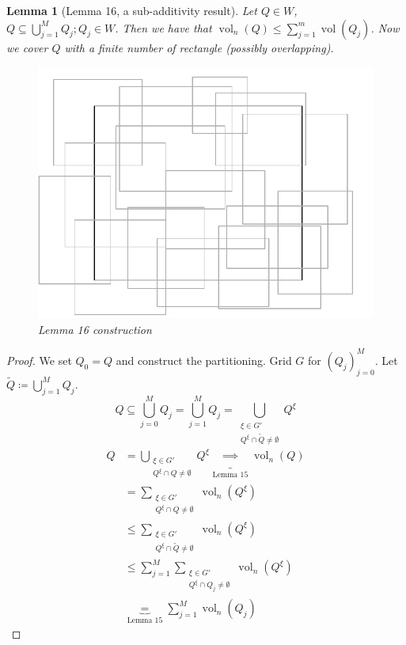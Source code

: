 \documentclass{article}
\newtheorem{lemma}{Lemma}  \numberwithin{lemma}{section}
\DeclareMathOperator{\vol}{vol}  %
\begin{document}
\begin{lemma}[Lemma 16, a sub-additivity result]
  Let $Q \in W$, $Q \subseteq \bigcup_{j=1}^M Q_j; Q_j \in W$.
  Then we have that $\vol_n(Q) \leq \sum_{j=1}^m \vol(Q_j)$.
  Now we cover $Q$ with a finite number of rectangle (possibly overlapping).
  \begin{figure}[!h]
    \begin{center}
      \includegraphics{img/11_lemma16.pdf}
      \caption{Lemma 16 construction}
    \end{center}
  \end{figure}
\end{lemma}

\begin{proof}
  We set $Q_0 = Q$ and construct the partitioning. Grid $G$ for $(Q_j)_{j=0}^M$.
  Let $\tilde Q \coloneqq \bigcup_{j=1}^M Q_j$.
  \[ Q \subseteq \bigcup_{j=0}^M Q_j = \bigcup_{j=1}^M Q_j = \bigcup_{\substack{\xi \in G' \\ Q^\xi \cap \tilde Q \neq \emptyset}} Q^\xi \]
  \begin{align*}
    Q &= \bigcup_{\substack{\xi \in G' \\ Q^\xi \cap Q \neq \emptyset}} Q^\xi \underbrace{\implies}_{\text{Lemma 15}} \vol_n(Q) \\
      &= \sum_{\substack{\xi \in G' \\ Q^\xi \cap Q \neq \emptyset}} \vol_n(Q^\xi) \\
      &\leq \sum_{\substack{\xi \in G' \\ Q^\xi \cap \tilde Q \neq \emptyset}} \vol_n(Q^\xi) \\
      &\leq \sum_{j=1}^M \sum_{\substack{\xi \in G' \\ Q^\xi \cap Q_j \neq \emptyset}} \vol_n(Q^\xi) \\
      &\underbrace{=}_{\text{Lemma 15}} \sum_{j=1}^M \vol_n(Q_j)
  \end{align*}
\end{proof}
\end{document}
